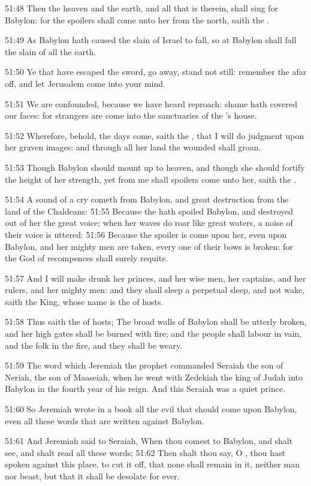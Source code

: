 51:48 Then the heaven and the earth, and all that is therein, shall sing for Babylon: for the spoilers shall come unto her from the north, saith the \LORD.

51:49 As Babylon hath caused the slain of Israel to fall, so at Babylon shall fall the slain of all the earth.

51:50 Ye that have escaped the sword, go away, stand not still: remember the \LORD afar off, and let Jerusalem come into your mind.

51:51 We are confounded, because we have heard reproach: shame hath covered our faces: for strangers are come into the sanctuaries of the \LORD's house.

51:52 Wherefore, behold, the days come, saith the \LORD, that I will do judgment upon her graven images: and through all her land the wounded shall groan.

51:53 Though Babylon should mount up to heaven, and though she should fortify the height of her strength, yet from me shall spoilers come unto her, saith the \LORD.

51:54 A sound of a cry cometh from Babylon, and great destruction from the land of the Chaldeans: 51:55 Because the \LORD hath spoiled Babylon, and destroyed out of her the great voice; when her waves do roar like great waters, a noise of their voice is uttered: 51:56 Because the spoiler is come upon her, even upon Babylon, and her mighty men are taken, every one of their bows is broken: for the \LORD God of recompences shall surely requite.

51:57 And I will make drunk her princes, and her wise men, her captains, and her rulers, and her mighty men: and they shall sleep a perpetual sleep, and not wake, saith the King, whose name is the \LORD of hosts.

51:58 Thus saith the \LORD of hosts; The broad walls of Babylon shall be utterly broken, and her high gates shall be burned with fire; and the people shall labour in vain, and the folk in the fire, and they shall be weary.

51:59 The word which Jeremiah the prophet commanded Seraiah the son of Neriah, the son of Maaseiah, when he went with Zedekiah the king of Judah into Babylon in the fourth year of his reign. And this Seraiah was a quiet prince.

51:60 So Jeremiah wrote in a book all the evil that should come upon Babylon, even all these words that are written against Babylon.

51:61 And Jeremiah said to Seraiah, When thou comest to Babylon, and shalt see, and shalt read all these words; 51:62 Then shalt thou say, O \LORD, thou hast spoken against this place, to cut it off, that none shall remain in it, neither man nor beast, but that it shall be desolate for ever.

